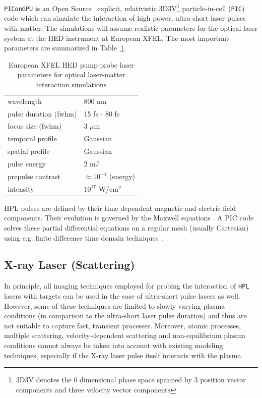 \documentclass[10pt]{scrartcl}
\begin{document}
\texttt{PIConGPU} is an Open Source~\cite{picongpu_github} explicit,
relativistic 3D3V\footnote{3D3V denotes the 6 dimensional phase space spanned by 3 position
vector components and three velocity vector components} particle-in-cell (\texttt{PIC}) code which can simulate the
interaction of high power, ultra-short laser pulses with matter.  The
simulations will assume realistic parameters for the optical laser system at the
HED instrument at European XFEL. The most important parameters are summarized in
Table~\ref{tab:short_pulse_laser_parameters}.

\begin{table}[h!]
\centering
\begin{tabular}{l|l}
  \hline
  \hline
  wavelength & 800 nm \\
  pulse duration (fwhm) & 15 fs - 80 fs \\
  focus size (fwhm)  & 3 $\mu\text{m}$ \\
  temporal profile &  Gaussian \\
  spatial profile &  Gaussian \\
  pulse energy & 2 mJ \\
  prepulse contrast & $\approx 10^{-4}$ (energy)\\
  intensity  & $10^{17}$ W/cm$^2$ \\
  \hline
  \hline
\end{tabular}
\caption{European XFEL HED pump-probe laser parameters for optical laser-matter interaction
simulations}
\label{tab:short_pulse_laser_parameters}
\end{table}

HPL pulses are defined by their time dependent
magnetic and electric field components. Their evolution is governed by the
Maxwell equations \cite{Jackson1975}. A PIC code solves these partial differential
equations on a regular mesh (usually
Cartesian) using e.g. finite difference time domain techniques~\cite{Yee1966}.

\subsection{X-ray Laser (Scattering)}

In principle, all imaging techniques employed for probing the interaction
of \texttt{HPL} lasers with targets can be used in the case of ultra-short
pulse lasers as well. However, some of these techniques are limited to slowly
varying plasma conditions (in comparison to the ultra-short laser pulse duration)
and thus are not suitable to capture fast, transient processes. Moreover, atomic
processes, multiple scattering, velocity-dependent scattering and
non-equilibrium plasma conditions cannot always be taken into account with
existing modeling techniques, especially if the X-ray laser pulse itself interacts
with the plasma.
\end{document}
